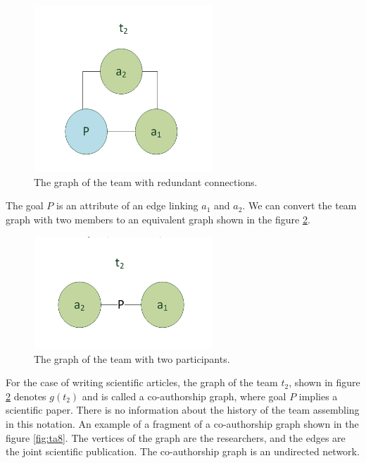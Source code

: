 \documentclass[12pt]{report}
\theoremstyle{definition}
\begin{document}
\begin{figure}[ht]
	\centering
	\includegraphics[width=0.6\textwidth]{scrum_fig6}
	\caption{The graph of the team with redundant connections.}
	\label{fig:ta6}	
\end{figure}  

The goal $P$ is an attribute of an edge linking $a_1$ and $a_2$.
We can convert the team graph with two members to an equivalent graph shown in the figure \ref{fig:ta7}.

\begin{figure}[ht]
	\centering
	\includegraphics[width=0.6\textwidth]{scrum_fig7}
	\caption{The graph of the team with two participants.}
	\label{fig:ta7}
\end{figure}  

For the case of writing scientific articles, the graph of the team  $t_2$, shown in figure \ref{fig:ta7} denotes $g(t_2)$ and is called a co-authorship graph, where goal $P$ implies a scientific paper.
There is no information about the history of the team assembling in this notation. 
An example of a fragment of a co-authorship graph shown in the figure \ref{fig:ta8}.
The vertices of the graph are the researchers, and the edges are the joint scientific publication. 
The co-authorship graph is an undirected network.
\end{document}
